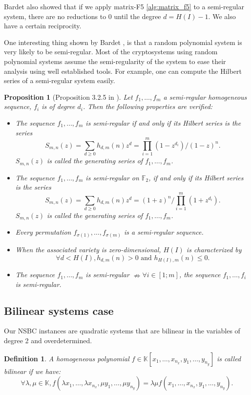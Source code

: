 \documentclass[english]{article}
\newtheorem{proposition}{Proposition}[section]
\newtheorem{definition}{Definition}[section]
\begin{document}
		Bardet also showed that if we apply matrix-F5 \ref{alg:matrix_f5} to a semi-regular system, there are no reductions to 0 until the degree $d = H(I) - 1$. We also have a certain reciprocity.
		
		One interesting thing shown by Bardet \cite{Bardet04}, is that a random polynomial system is very likely to be semi-regular. Most of the cryptosystems using random polynomial systems assume the semi-regularity of the system to ease their analysis using well established tools. For example, one can compute the Hilbert series of a semi-regular system easily.
		
		\begin{proposition}[Proposition 3.2.5 in \cite{Bardet04}]\label{PropSemi}
			Let $f_1,\dots,f_m$ a semi-regular homogeneous sequence, $f_i$ is of degree $d_i$. Then the following properties are verified:
			\begin{itemize}
				\item The sequence $f_1,\dots,f_m$ is semi-regular if and only if its Hilbert series is the series $$S_{m, n}(z) = \sum_{d \geq 0}h_{d, m}(n)z^d = \prod_{i=1}^{m}(1-z^{d_i})/(1-z)^n.$$ $S_{m, n}(z)$ is called the generating series of $f_1,\dots,f_m$.
				\item The sequence $f_1,\dots,f_m$ is semi-regular on $\mathbb{F}_2$, if and only if its Hilbert series is the series $$S_{m, n}(z) = \sum_{d \geq 0}h_{d, m}(n)z^d = (1+z)^n/\prod_{i=1}^{m}(1+z^{d_i}).$$ $S_{m, n}(z)$ is called the generating series of $f_1,\dots,f_m$.
				\item Every permutation $f_{\sigma(1)},\dots,f_{\sigma(m)}$ is a semi-regular sequence.
				\item When the associated variety is zero-dimensional, $H(I)$ is characterized by
				$$
				\forall d < H(I), h_{d, m}(n) > 0 \text{ and } h_{H(I), m}(n) \leq 0.
				$$
				\item The sequence $f_1,\dots,f_m$ is semi-regular $\nRightarrow \forall i \in [1;m]$, the sequence $f_1,\dots,f_i$ is semi-regular. 
			\end{itemize}
		\end{proposition}
		
		\subsection{Bilinear systems case}
		Our NSBC instances are quadratic systems that are bilinear in the variables of degree 2 and overdetermined.
		
		\begin{definition}
			A homogeneous polynomial $f \in \mathbb{K}[x_1,\dots,x_{n_x},y_1,\dots,y_{n_y}]$ is called bilinear if we have:
			$$
			\forall \lambda, \mu \in \mathbb{K}, f(\lambda x_1,\dots,\lambda x_{n_x}, \mu y_1,\dots, \mu y_{n_y}) = \lambda \mu f(x_1,\dots,x_{n_x},y_1,\dots,y_{n_y}).
			$$
		\end{definition}
		
\end{document}
